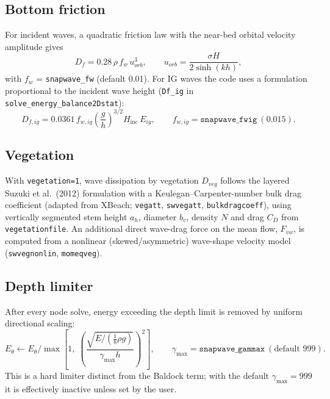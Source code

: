 \documentclass[11pt,a4paper]{article}
\newcommand{\ee}{E_\theta}
\newcommand{\code}[1]{\texttt{#1}}
\begin{document}
\subsection{Bottom friction}

For incident waves, a quadratic friction law with the near-bed orbital velocity
amplitude gives
\begin{equation}
D_f=0.28\,\rho\, f_w\, u_{orb}^{3},
\qquad
u_{orb}=\frac{\sigma H}{2\sinh(kh)},
\end{equation}
with $f_w$ = \code{snapwave\_fw} (default 0.01). For IG waves the code uses a
formulation proportional to the incident wave height
(\code{Df\_ig} in \code{solve\_energy\_balance2Dstat}):
\begin{equation}
D_{f,ig}=0.0361\,f_{w,ig}\left(\frac{g}{h}\right)^{3/2} H_{\mathrm{inc}}\,E_{ig},
\qquad f_{w,ig}=\code{snapwave\_fwig}\ (0.015).
\end{equation}

\subsection{Vegetation}

With \code{vegetation=1}, wave dissipation by vegetation $D_{veg}$ follows the
layered Suzuki et al.\ (2012) formulation with a Keulegan--Carpenter-number bulk
drag coefficient (adapted from XBeach; \code{vegatt}, \code{swvegatt},
\code{bulkdragcoeff}), using vertically segmented stem height $a_h$, diameter
$b_v$, density $N$ and drag $C_D$ from \code{vegetationfile}. An additional
direct wave-drag force on the mean flow, $F_{vw}$, is computed from a
nonlinear (skewed/asymmetric) wave-shape velocity model (\code{swvegnonlin},
\code{momeqveg}).

\subsection{Depth limiter}

After every node solve, energy exceeding the depth limit is removed by uniform
directional scaling:
\begin{equation}
\ee \leftarrow \ee \Big/
\max\!\left[1,\;
\left(\frac{\sqrt{E/\left(\tfrac18\rho g\right)}}{\gamma_{\max} h}\right)^{2}
\right],
\qquad \gamma_{\max}=\code{snapwave\_gammax}\ (\text{default } 999).
\label{eq:depthlimit}
\end{equation}
This is a hard limiter distinct from the Baldock term; with the default
$\gamma_{\max}=999$ it is effectively inactive unless set by the user.
\end{document}
